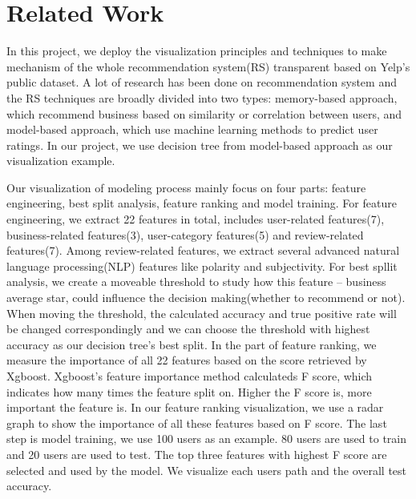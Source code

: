 \section{Related Work}
\label{sec:related} 


In this project, we deploy the visualization principles and techniques to make mechanism of the whole recommendation system(RS) transparent based on Yelp's public dataset\cite{}. A lot of research has been done on recommendation system and the RS techniques are broadly divided into two types: memory-based approach, which recommend business based on similarity or correlation between users\cite{}, and model-based approach, which use machine learning methods to predict user ratings\cite{}. In our project, we use decision tree from model-based approach\cite{} as our visualization example. 

Our visualization of modeling process mainly focus on four parts: feature engineering, best split analysis, feature ranking and model training. For feature engineering, we extract 22 features in total, includes user-related features(7), business-related features(3), user-category features(5) and review-related features(7). Among review-related features, we extract several advanced natural language processing(NLP) features like polarity\cite{} and subjectivity\cite{}. For best spllit analysis, we create a moveable threshold to study how this feature -- business average star, could influence the decision making(whether to recommend or not). When moving the threshold, the calculated accuracy and true positive rate\cite{} will be changed correspondingly and we can choose the threshold with highest accuracy as our decision tree's best split. In the part of feature ranking, we measure the importance of all 22 features based on the score retrieved by Xgboost\cite{}. Xgboost's feature importance method calculateds F score, which indicates how many times the feature split on. Higher the F score is, more important the feature is. In our feature ranking visualization, we use a radar graph to show the importance of all these features based on F score. The last step is model training, we use 100 users as an example. 80 users are used to train and 20 users are used to test. The top three features with highest F score are selected and used by the model. We visualize each users path and the overall test accuracy.